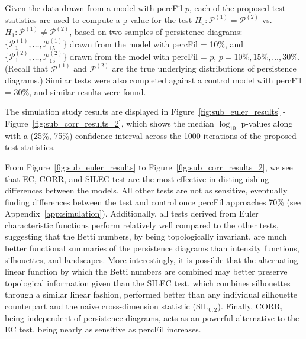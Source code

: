 \documentclass[12pt]{article}
\newcommand{\figref}[1]{Figure~\ref{#1}}
\begin{document}
Given the data drawn from a model with percFil $p$, each of the proposed test statistics are used to compute a p-value for the test $H_0: \mathcal
P^{(1)} = \mathcal P^{(2)}$ vs. $H_1: \mathcal P^{(1)} \neq \mathcal P^{(2)}$,
based on two samples of persistence diagrams: $\{\mathcal
P_1^{(1)}, \ldots, \mathcal P_{15}^{(1)}\}$ drawn from the model with percFil = 10\%, and $\{\mathcal P_1^{(2)}, \ldots,
\mathcal P_{15}^{(2)}\}$ drawn from the model with percFil = $p$, $p = 10\%, 15\%, \ldots, 30\%$.
(Recall that $\mathcal P^{(1)}$ and $\mathcal P^{(2)}$ are the true underlying distributions of persistence diagrams.)
Similar tests were also completed against a control model with percFil = 30\%, and similar results were found. 


The simulation study results are displayed in \figref{fig:sub_euler_results} - \figref{fig:sub_corr_results_2}, which shows the median $\log_{10}$ p-values along with a (25\%, 75\%) confidence interval across the 1000 iterations of the proposed test statistics.


From \figref{fig:sub_euler_results} to \figref{fig:sub_corr_results_2}, we see that  EC,  CORR, and SILEC test are the most effective in distinguishing differences between the models. 
All other tests are not as sensitive, eventually finding differences between the test and control once percFil approaches 70\% (see Appendix~\ref{app:simulation}). Additionally, all tests derived from Euler characteristic functions perform relatively well compared to the other tests, suggesting that the Betti numbers, by being topologically invariant, are much better functional summaries of the persistence diagrams than intensity functions, silhouettes, and landscapes. More interestingly, it is possible that the alternating linear function by which the Betti numbers are combined may better preserve topological information given than the SILEC test, which combines silhouettes through a similar linear fashion, performed better than any individual silhouette counterpart and the naive cross-dimension statistic (SIL$_{0:2}$). Finally,  CORR, being independent of persistence diagrams, acts as an powerful alternative to the EC test, being nearly as sensitive as percFil increases.
\end{document}
